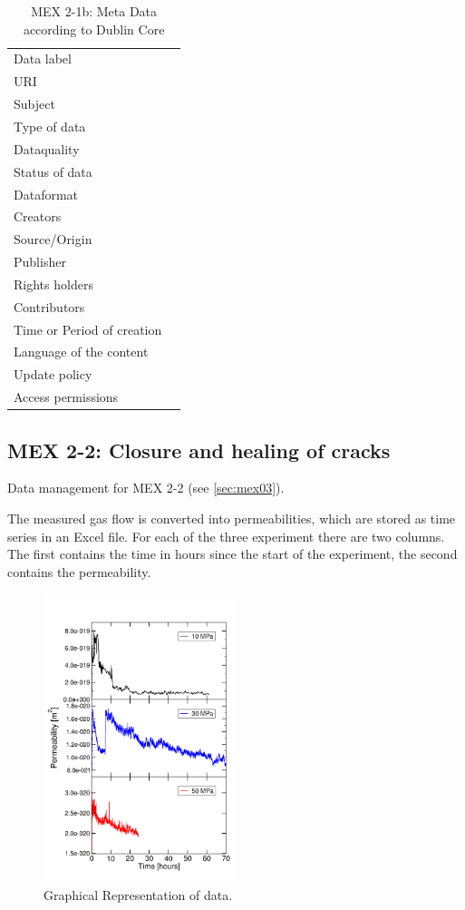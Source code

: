 \begin{table}[!ht]
\caption{MEX 2-1b: Meta Data according to Dublin Core}
\label{tab:dms-mex2-1b}
\small
\begin{tabular}{R{3cm}|L{7cm}}
\hline
%
Data label &  \\
URI &  \\
Subject  &  \\
Type of data  &  \\
Dataquality  &  \\
Status of data  &  \\
Dataformat  & \\
Creators  &  \\
Source/Origin &  \\
Publisher  &  \\
Rights holders &  \\
Contributors &  \\
Time or Period of creation &  \\
Language of the content &  \\
Update policy &  \\
Access permissions &  \\
%
\hline
\end{tabular}
\end{table}

\subsection{MEX 2-2: Closure and healing of cracks}

Data management for MEX 2-2 (see \ref{sec:mex03}).


The measured gas flow is converted into permeabilities, which are stored as time series in an Excel file. For each of the three experiment there are two columns. The first contains the time in hours since the start of the experiment, the second contains the permeability. 

\begin{figure}[!ht]
\centering
\includegraphics[width=0.5\textwidth]{figures/mex3-perme-time-comparison.png}
\caption{Graphical Representation of data.}
\label{fig:ME3-perme-exp-dmp}
\end{figure}

